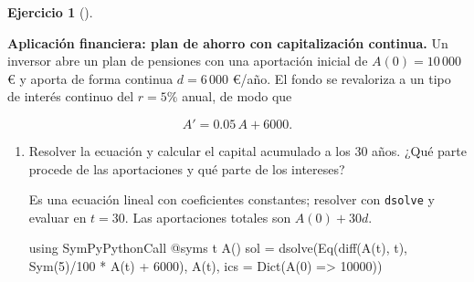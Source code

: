 \documentclass[
  spanish,
  a4paper,
]{scrreport}
\newenvironment{Shaded}{\begin{snugshade}}{\end{snugshade}}
\newcommand{\BuiltInTok}[1]{\textcolor[rgb]{0.00,0.23,0.31}{#1}}
\newcommand{\FloatTok}[1]{\textcolor[rgb]{0.68,0.00,0.00}{#1}}
\newcommand{\FunctionTok}[1]{\textcolor[rgb]{0.28,0.35,0.67}{#1}}
\newcommand{\ImportTok}[1]{\textcolor[rgb]{0.00,0.46,0.62}{#1}}
\newcommand{\NormalTok}[1]{\textcolor[rgb]{0.00,0.23,0.31}{#1}}
\newcommand{\OperatorTok}[1]{\textcolor[rgb]{0.37,0.37,0.37}{#1}}
\newcommand{\PreprocessorTok}[1]{\textcolor[rgb]{0.68,0.00,0.00}{#1}}
\theoremstyle{definition}
\newtheorem{exercise}{Ejercicio}[chapter]
\theoremstyle{remark}
\begin{document}
\begin{exercise}[]\protect\hypertarget{exr-finanzas-plan-pensiones}{}\label{exr-finanzas-plan-pensiones}

\textbf{Aplicación financiera: plan de ahorro con capitalización
continua.} Un inversor abre un plan de pensiones con una aportación
inicial de \(A(0) = 10\,000\) € y aporta de forma continua
\(d = 6\,000\) €/año. El fondo se revaloriza a un tipo de interés
continuo del \(r = 5\%\) anual, de modo que

\[
A' = 0.05\,A + 6000.
\]

\begin{enumerate}
\def\labelenumi{\alph{enumi}.}
\item
  Resolver la ecuación y calcular el capital acumulado a los 30 años.
  ¿Qué parte procede de las aportaciones y qué parte de los intereses?

  \begin{tcolorbox}[enhanced jigsaw, arc=.35mm, bottomrule=.15mm, bottomtitle=1mm, breakable, colback=white, colbacktitle=quarto-callout-note-color!10!white, colframe=quarto-callout-note-color-frame, coltitle=black, left=2mm, leftrule=.75mm, opacityback=0, opacitybacktitle=0.6, rightrule=.15mm, title=\textcolor{quarto-callout-note-color}{\faInfo}\hspace{0.5em}{Ayuda}, titlerule=0mm, toprule=.15mm, toptitle=1mm]

  Es una ecuación lineal con coeficientes constantes; resolver con
  \texttt{dsolve} y evaluar en \(t=30\). Las aportaciones totales son
  \(A(0) + 30d\).

  \end{tcolorbox}

  \begin{tcolorbox}[enhanced jigsaw, arc=.35mm, bottomrule=.15mm, bottomtitle=1mm, breakable, colback=white, colbacktitle=quarto-callout-tip-color!10!white, colframe=quarto-callout-tip-color-frame, coltitle=black, left=2mm, leftrule=.75mm, opacityback=0, opacitybacktitle=0.6, rightrule=.15mm, title=\textcolor{quarto-callout-tip-color}{\faLightbulb}\hspace{0.5em}{Solución}, titlerule=0mm, toprule=.15mm, toptitle=1mm]

\begin{Shaded}
\begin{Highlighting}[]
\ImportTok{using} \BuiltInTok{SymPyPythonCall}
\PreprocessorTok{@syms}\NormalTok{ t }\FunctionTok{A}\NormalTok{()}
\NormalTok{sol }\OperatorTok{=} \FunctionTok{dsolve}\NormalTok{(}\FunctionTok{Eq}\NormalTok{(}\FunctionTok{diff}\NormalTok{(}\FunctionTok{A}\NormalTok{(t), t), }\FunctionTok{Sym}\NormalTok{(}\FloatTok{5}\NormalTok{)}\OperatorTok{/}\FloatTok{100} \OperatorTok{*} \FunctionTok{A}\NormalTok{(t) }\OperatorTok{+} \FloatTok{6000}\NormalTok{), }\FunctionTok{A}\NormalTok{(t), ics }\OperatorTok{=} \FunctionTok{Dict}\NormalTok{(}\FunctionTok{A}\NormalTok{(}\FloatTok{0}\NormalTok{) }\OperatorTok{=\textgreater{}} \FloatTok{10000}\NormalTok{))}
\end{Highlighting}
\end{Shaded}


\end{tcolorbox}
\end{enumerate}
\end{exercise}
\end{document}
